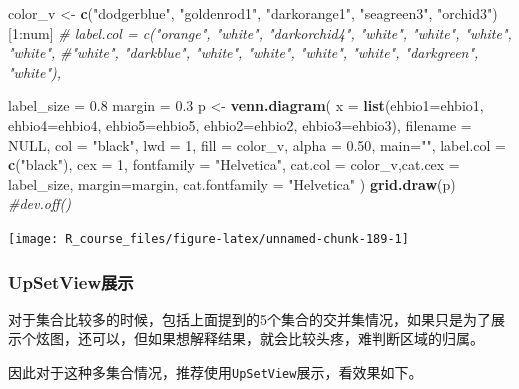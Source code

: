 \documentclass[]{article}
\newenvironment{Shaded}{\begin{snugshade}}{\end{snugshade}}
\newcommand{\KeywordTok}[1]{\textcolor[rgb]{0.13,0.29,0.53}{\textbf{{#1}}}}
\newcommand{\DataTypeTok}[1]{\textcolor[rgb]{0.13,0.29,0.53}{{#1}}}
\newcommand{\DecValTok}[1]{\textcolor[rgb]{0.00,0.00,0.81}{{#1}}}
\newcommand{\FloatTok}[1]{\textcolor[rgb]{0.00,0.00,0.81}{{#1}}}
\newcommand{\StringTok}[1]{\textcolor[rgb]{0.31,0.60,0.02}{{#1}}}
\newcommand{\CommentTok}[1]{\textcolor[rgb]{0.56,0.35,0.01}{\textit{{#1}}}}
\newcommand{\OtherTok}[1]{\textcolor[rgb]{0.56,0.35,0.01}{{#1}}}
\newcommand{\NormalTok}[1]{{#1}}
\numberwithin{figure}{section}
\numberwithin{table}{section}
\theoremstyle{definition}
\theoremstyle{definition}
\theoremstyle{definition}
\theoremstyle{remark}
\begin{document}
\begin{Shaded}
\begin{Highlighting}[]
\NormalTok{color_v <-}\StringTok{ }\KeywordTok{c}\NormalTok{(}\StringTok{"dodgerblue"}\NormalTok{, }\StringTok{"goldenrod1"}\NormalTok{, }\StringTok{"darkorange1"}\NormalTok{, }\StringTok{"seagreen3"}\NormalTok{, }\StringTok{"orchid3"}\NormalTok{)[}\DecValTok{1}\NormalTok{:num]}
\CommentTok{# label.col = c("orange", "white", "darkorchid4", "white", "white", "white", "white", }
    \CommentTok{#"white", "darkblue", "white", "white", "white", "white", "darkgreen", "white"),}

\NormalTok{label_size =}\StringTok{ }\FloatTok{0.8}
\NormalTok{margin =}\StringTok{ }\FloatTok{0.3}
\NormalTok{p <-}\StringTok{ }\KeywordTok{venn.diagram}\NormalTok{( }
    \DataTypeTok{x =} \KeywordTok{list}\NormalTok{(}\DataTypeTok{ehbio1=}\NormalTok{ehbio1, }\DataTypeTok{ehbio4=}\NormalTok{ehbio4,}
    \DataTypeTok{ehbio5=}\NormalTok{ehbio5, }\DataTypeTok{ehbio2=}\NormalTok{ehbio2,}
    \DataTypeTok{ehbio3=}\NormalTok{ehbio3),}
    \DataTypeTok{filename =} \OtherTok{NULL}\NormalTok{, }\DataTypeTok{col =} \StringTok{"black"}\NormalTok{, }\DataTypeTok{lwd =} \DecValTok{1}\NormalTok{, }
    \DataTypeTok{fill =} \NormalTok{color_v,}
    \DataTypeTok{alpha =} \FloatTok{0.50}\NormalTok{, }\DataTypeTok{main=}\StringTok{""}\NormalTok{, }
    \DataTypeTok{label.col =} \KeywordTok{c}\NormalTok{(}\StringTok{"black"}\NormalTok{),}
    \DataTypeTok{cex =} \DecValTok{1}\NormalTok{, }\DataTypeTok{fontfamily =} \StringTok{"Helvetica"}\NormalTok{,}
    \DataTypeTok{cat.col =} \NormalTok{color_v,}\DataTypeTok{cat.cex =} \NormalTok{label_size, }
    \DataTypeTok{margin=}\NormalTok{margin, }
    \DataTypeTok{cat.fontfamily =} \StringTok{"Helvetica"}
\NormalTok{)}
\KeywordTok{grid.draw}\NormalTok{(p)}
\CommentTok{#dev.off()}
\end{Highlighting}
\end{Shaded}

\begin{center}\texttt{[image: R\_course\_files/figure-latex/unnamed-chunk-189-1]} \end{center}

\subsubsection{UpSetView展示}\label{upsetview}

对于集合比较多的时候，包括上面提到的5个集合的交并集情况，如果只是为了展示个炫图，还可以，但如果想解释结果，就会比较头疼，难判断区域的归属。

因此对于这种多集合情况，推荐使用\texttt{UpSetView}展示，看效果如下。
\end{document}
